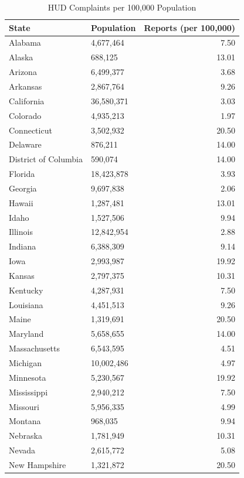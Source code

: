 \documentclass{article}
\begin{document}
\begin{table}[htbp]
\centering
\caption{HUD Complaints per 100,000 Population} 
\label{tab:HUDComplaints}
{\small
\begin{tabular}{llr}
  \hline
State & Population & Reports (per 100,000) \\ 
  \hline
Alabama & 4,677,464 & 7.50 \\ 
  Alaska & 688,125 & 13.01 \\ 
  Arizona & 6,499,377 & 3.68 \\ 
  Arkansas & 2,867,764 & 9.26 \\ 
  California & 36,580,371 & 3.03 \\ 
  Colorado & 4,935,213 & 1.97 \\ 
  Connecticut & 3,502,932 & 20.50 \\ 
  Delaware & 876,211 & 14.00 \\ 
  District of Columbia & 590,074 & 14.00 \\ 
  Florida & 18,423,878 & 3.93 \\ 
  Georgia & 9,697,838 & 2.06 \\ 
  Hawaii & 1,287,481 & 13.01 \\ 
  Idaho & 1,527,506 & 9.94 \\ 
  Illinois & 12,842,954 & 2.88 \\ 
  Indiana & 6,388,309 & 9.14 \\ 
  Iowa & 2,993,987 & 19.92 \\ 
  Kansas & 2,797,375 & 10.31 \\ 
  Kentucky & 4,287,931 & 7.50 \\ 
  Louisiana & 4,451,513 & 9.26 \\ 
  Maine & 1,319,691 & 20.50 \\ 
  Maryland & 5,658,655 & 14.00 \\ 
  Massachusetts & 6,543,595 & 4.51 \\ 
  Michigan & 10,002,486 & 4.97 \\ 
  Minnesota & 5,230,567 & 19.92 \\ 
  Mississippi & 2,940,212 & 7.50 \\ 
  Missouri & 5,956,335 & 4.99 \\ 
  Montana & 968,035 & 9.94 \\ 
  Nebraska & 1,781,949 & 10.31 \\ 
  Nevada & 2,615,772 & 5.08 \\ 
  New Hampshire & 1,321,872 & 20.50 \\ 

\end{tabular}}
\end{table}
\end{document}
